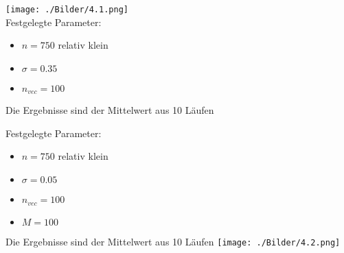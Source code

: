 \begin{frame}
    \begin{multicols}{2}
        \columnbreak
            \texttt{[image: ./Bilder/4.1.png]}\\
        \columnbreak
        \vspace{1cm}
        Festgelegte Parameter:
        \begin{itemize}
            \item $n = 750$ relativ klein
            \item $\sigma = 0.35$
            \item $n_{vec} = 100$
        \end{itemize}
        Die Ergebnisse sind der Mittelwert aus 10 Läufen
    \end{multicols} 
\end{frame}

\begin{frame}
    \begin{multicols}{2}
        \columnbreak
        Festgelegte Parameter:
        \begin{itemize}
            \item $n = 750$ relativ klein
            \item $\sigma = 0.05$
            \item $n_{vec} = 100$
            \item $M = 100$
        \end{itemize}
        Die Ergebnisse sind der Mittelwert aus 10 Läufen
        \columnbreak
        \texttt{[image: ./Bilder/4.2.png]}       
    \end{multicols} 
\end{frame}
